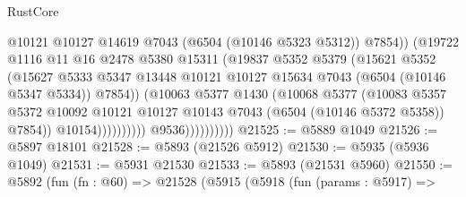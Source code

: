 \begin{lexlean}{RustCore}
\begin{coremodule}
                                          @10121
                                          @10127
                                          @14619
                                          @7043
                                          (@6504 (@10146 @5323 @5312))
                                          @7854))
                                      (@19722
                                        @1116
                                        @11
                                        @16
                                        @2478
                                        @5380
                                        @15311
                                        (@19837
                                          @5352
                                          @5379
                                          (@15621
                                            @5352
                                            (@15627
                                              @5333
                                              @5347
                                              @13448
                                              @10121
                                              @10127
                                              @15634
                                              @7043
                                              (@6504 (@10146 @5347 @5334))
                                              @7854))
                                          (@10063
                                            @5377
                                            @1430
                                            (@10068
                                              @5377
                                              (@10083
                                                @5357
                                                @5372
                                                @10092
                                                @10121
                                                @10127
                                                @10143
                                                @7043
                                                (@6504 (@10146 @5372 @5358))
                                                @7854))
                                            @10154))))))))))
                        @9536))))))))))
@21525 := @5889 @1049
@21526 := @5897 @18101
@21528 := @5893 (@21526 @5912)
@21530 := @5935 (@5936 @1049)
@21531 := @5931 @21530
@21533 := @5893 (@21531 @5960)
@21550 := @5892
    (fun (fn : @60) =>
    @21528
      (@5915
        (@5918
          (fun (params : @5917) =>

\end{coremodule}
\end{lexlean}
